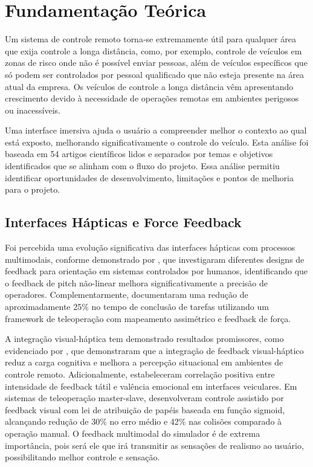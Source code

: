 \chapter{Fundamentação Teórica}
\label{chap:fundamentacao-teorica}

Um sistema de controle remoto torna-se extremamente útil para qualquer área que exija controle a longa distância, como, por exemplo, controle de veículos em zonas de risco onde não é possível enviar pessoas, além de veículos específicos que só podem ser controlados por pessoal qualificado que não esteja presente na área atual da empresa. Os veículos de controle a longa distância vêm apresentando crescimento devido à necessidade de operações remotas em ambientes perigosos ou inacessíveis.

Uma interface imersiva ajuda o usuário a compreender melhor o contexto ao qual está exposto, melhorando significativamente o controle do veículo. Esta análise foi baseada em 54 artigos científicos lidos e separados por temas e objetivos identificados que se alinham com o fluxo do projeto. Essa análise permitiu identificar oportunidades de desenvolvimento, limitações e pontos de melhoria para o projeto.

\section{Interfaces Hápticas e Force Feedback}
\label{sec:interfaces-hapticas}

Foi percebida uma evolução significativa das interfaces hápticas com processos multimodais, conforme demonstrado por , que investigaram diferentes designs de feedback para orientação em sistemas controlados por humanos, identificando que o feedback de pitch não-linear melhora significativamente a precisão de operadores. Complementarmente,  documentaram uma redução de aproximadamente 25\% no tempo de conclusão de tarefas utilizando um framework de teleoperação com mapeamento assimétrico e feedback de força.

A integração visual-háptica tem demonstrado resultados promissores, como evidenciado por , que demonstraram que a integração de feedback visual-háptico reduz a carga cognitiva e melhora a percepção situacional em ambientes de controle remoto. Adicionalmente,  estabeleceram correlação positiva entre intensidade de feedback tátil e valência emocional em interfaces veiculares. Em sistemas de teleoperação master-slave,  desenvolveram controle assistido por feedback visual com lei de atribuição de papéis baseada em função sigmoid, alcançando redução de 30\% no erro médio e 42\% nas colisões comparado à operação manual. O feedback multimodal do simulador é de extrema importância, pois será ele que irá transmitir as sensações de realismo ao usuário, possibilitando melhor controle e sensação.

